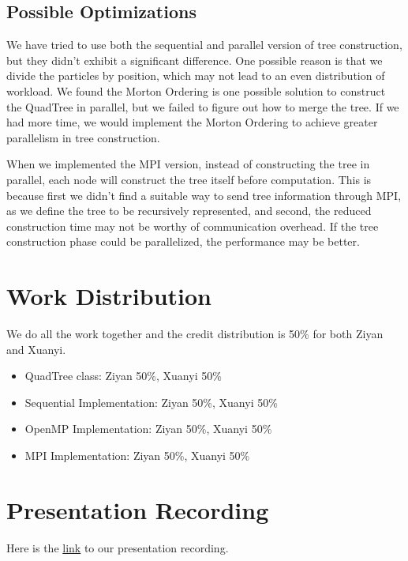 \documentclass{article}
\begin{document}
\subsection{Possible Optimizations}
We have tried to use both the sequential and parallel version of tree construction, but they didn't exhibit a significant difference. One possible reason is that we divide the particles by position, which may not lead to an even distribution of workload. We found the Morton Ordering is one possible solution to construct the QuadTree in parallel, but we failed to figure out how to merge the tree. If we had more time, we would implement the Morton Ordering to achieve greater parallelism in tree construction.

When we implemented the MPI version, instead of constructing the tree in parallel, each node will construct the tree itself before computation. This is because first we didn't find a suitable way to send tree information through MPI, as we define the tree to be recursively represented, and second, the reduced construction time may not be worthy of communication overhead. If the tree construction phase could be parallelized, the performance may be better. 

\section{Work Distribution}
We do all the work together and the credit distribution is 50\% for both Ziyan and Xuanyi.
\begin{itemize}
	\item QuadTree class: Ziyan 50\%, Xuanyi 50\%
	\item Sequential Implementation: Ziyan 50\%, Xuanyi 50\%
	\item OpenMP Implementation: Ziyan 50\%, Xuanyi 50\%
	\item MPI Implementation: Ziyan 50\%, Xuanyi 50\%
\end{itemize}

\section{Presentation Recording}

Here is the \href{https://drive.google.com/file/d/1RWtDtKngdG5eYxdTDus273mshyyEP-Mo/view?usp=sharing}{link} to our presentation recording.

{

}
\end{document}
